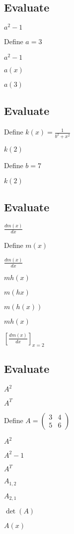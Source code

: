 \documentclass{article}
\begin{document}
\subsection{Evaluate}

$a^{2}-1$

Define $a=3$

$a^{2}-1$

$a\left( x\right) $

$a\left( 3\right) $

\subsection{Evaluate}

Define $k\left( x\right) =\frac{1}{b^{2}+x^{2}}$

$k\left( 2\right) $

Define $b=7$

$k\left( 2\right) $

\subsection{Evaluate}

$\frac{dm\left( x\right) }{dx}$

Define $m\left( x\right) $

$\frac{dm\left( x\right) }{dx}$

$mh(x)$

$m(hx)$

$m(h(x))$

$mh(x)$

$\left[ \frac{dm\left( x\right) }{dx}\right] _{x=2}$

\subsection{Evaluate}

$A^{2}$

$A^{T}$

Define $A=\left( 
\begin{array}{cc}
3 & 4 \\ 
5 & 6%
\end{array}%
\right) $

$A^{2}$

$A^{2}-1$

$A^{T}$

$A_{1,2}$

$A_{2,1}$

$\det \left( A\right) $

$A\left( x\right) $
\end{document}
